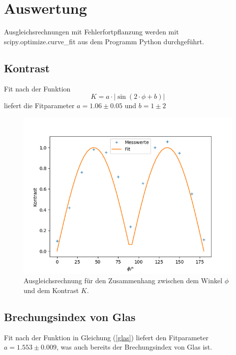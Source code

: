 \section{Auswertung}

Ausgleichsrechnungen mit Fehlerfortpflanzung werden mit scipy.optimize.curve\_fit aus dem Programm
Python durchgeführt.

\subsection{Kontrast}

Fit nach der Funktion
\[
K = a \cdot | \sin (2 \cdot \phi + b) |
\]
liefert die Fitparameter $a = 1.06 \pm 0.05$ und $b = 1 \pm 2$

\begin{figure}[h]
\centering
\includegraphics[width=\linewidth]{img/kontrast.png}
\caption{Ausgleichsrechnung für den Zusammenhang zwischen dem Winkel $\phi$ und dem Kontrast $K$.}
\label{kontrast}
\end{figure}

\subsection{Brechungsindex von Glas}

Fit nach der Funktion in Gleichung (\ref{glas})
liefert den Fitparameter $a = 1.553 \pm 0.009$, was auch bereits der Brechungsindex von Glas ist.

